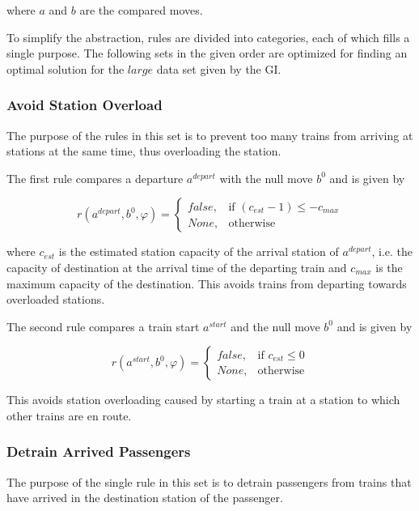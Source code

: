 \documentclass[a4paper,12pt,parskip]{article}
\begin{document}
\noindent where $a$ and $b$ are the compared moves.

To simplify the abstraction, rules are divided into categories, each of which 
fills a single purpose. The following sets in the given order are optimized for 
finding an optimal solution for the $large$ data set given by the GI.

\subsubsection{Avoid Station Overload}
\label{rule:1}

The purpose of the rules in this set is to prevent too many trains from arriving 
at stations at the same time, thus overloading the station. 

The first rule compares a departure $a^{depart}$ with the null move $b^0$ and is 
given by

\[
    r(a^{depart}, b^0, \varphi) = 
    \begin{cases}
        false,& \text{if } (c_{est} - 1) \leq -c_{max} \\
        None,& \text{otherwise}
    \end{cases}
\]

\noindent where $c_{est}$ is the estimated station capacity of the arrival station of 
$a^{depart}$, i.e. the capacity of destination at the arrival time of 
the departing train and $c_{max}$ is the maximum capacity of the destination. 
This avoids trains from departing towards overloaded stations.

The second rule compares a train start $a^{start}$ and the null move $b^0$ and is 
given by 

\[
    r(a^{start}, b^0, \varphi) = 
    \begin{cases}
        false,& \text{if } c_{est} \leq 0 \\
        None,& \text{otherwise}
    \end{cases}
\]

\noindent This avoids station overloading caused by starting a train at a station 
to which other trains are en route.

\subsubsection{Detrain Arrived Passengers}
\label{rule:2}

The purpose of the single rule in this set is to detrain passengers from trains that 
have arrived in the destination station of the passenger.
\end{document}

